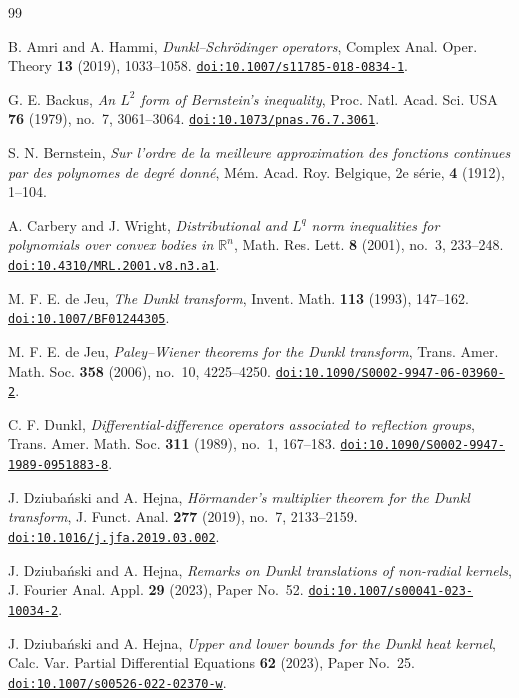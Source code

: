 \documentclass[12pt]{article}
\newcommand{\doi}[1]{\href{https://doi.org/#1}{\nolinkurl{doi:#1}}}
\begin{document}
\begin{thebibliography}{99}

B. Amri and A. Hammi, \emph{Dunkl--Schr\"odinger operators}, Complex Anal. Oper. Theory \textbf{13} (2019), 1033--1058. \doi{10.1007/s11785-018-0834-1}.

G. E. Backus, \emph{An $L^2$ form of Bernstein's inequality}, Proc. Natl. Acad. Sci. USA \textbf{76} (1979), no.~7, 3061--3064. \doi{10.1073/pnas.76.7.3061}.

S. N. Bernstein, \emph{Sur l'ordre de la meilleure approximation des fonctions continues par des polynomes de degr\'e donn\'e}, M\'em. Acad. Roy. Belgique, 2e s\'erie, \textbf{4} (1912), 1--104.

A. Carbery and J. Wright, \emph{Distributional and $L^q$ norm inequalities for polynomials over convex bodies in $\mathbb{R}^n$}, Math. Res. Lett. \textbf{8} (2001), no.~3, 233--248. \doi{10.4310/MRL.2001.v8.n3.a1}.

M. F. E. de Jeu, \emph{The Dunkl transform}, Invent. Math. \textbf{113} (1993), 147--162. \doi{10.1007/BF01244305}.

M. F. E. de Jeu, \emph{Paley--Wiener theorems for the Dunkl transform}, Trans. Amer. Math. Soc. \textbf{358} (2006), no.~10, 4225--4250. \doi{10.1090/S0002-9947-06-03960-2}.

C. F. Dunkl, \emph{Differential-difference operators associated to reflection groups}, Trans. Amer. Math. Soc. \textbf{311} (1989), no.~1, 167--183. \doi{10.1090/S0002-9947-1989-0951883-8}.

J. Dziuba\'nski and A. Hejna, \emph{H\"ormander's multiplier theorem for the Dunkl transform}, J. Funct. Anal. \textbf{277} (2019), no.~7, 2133--2159. \doi{10.1016/j.jfa.2019.03.002}.
 
J. Dziuba\'nski and A. Hejna, \emph{Remarks on Dunkl translations of non-radial kernels}, J. Fourier Anal. Appl. \textbf{29} (2023), Paper No.~52. \doi{10.1007/s00041-023-10034-2}.
 
J. Dziuba\'nski and A. Hejna, \emph{Upper and lower bounds for the Dunkl heat kernel}, Calc. Var. Partial Differential Equations \textbf{62} (2023), Paper No.~25. \doi{10.1007/s00526-022-02370-w}.


\end{thebibliography}
\end{document}
